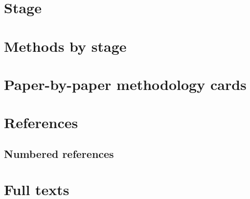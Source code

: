 \documentclass[fontsize=10.5pt,a4paper,oneside,open=any,parskip=half-,headings=standardclasses,toc=bibliography]{scrreprt}
\providecommand\gendir{generated}
\begin{document}




\ifdefined\onlystage
  \part{Stage \onlystage}
  
\else
  \part{Methods by stage}
  
  
  
  
  
  
  
  
  
  
\fi

\part{Paper-by-paper methodology cards}



\part{References}
\hypertarget{refs}{}
\chapter{Numbered references}

{\small}

\part{Full texts}



\end{document}

